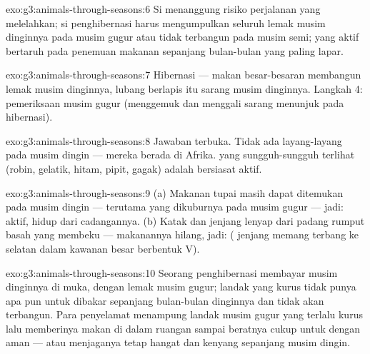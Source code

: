 \begin{solution}{exo:g3:animals-through-seasons:6}
Si  menanggung risiko perjalanan yang melelahkan; si
penghibernasi harus mengumpulkan seluruh lemak musim dinginnya pada
musim gugur atau tidak terbangun pada musim semi;  yang aktif
bertaruh pada penemuan makanan sepanjang bulan-bulan yang paling
lapar.
\end{solution}

\begin{solution}{exo:g3:animals-through-seasons:7}
Hibernasi --- makan besar-besaran membangun lemak musim dinginnya,
lubang berlapis  itu sarang musim dinginnya. Langkah 4: pemeriksaan
musim gugur (menggemuk dan menggali sarang menunjuk pada hibernasi).
\end{solution}

\begin{solution}{exo:g3:animals-through-seasons:8}
Jawaban terbuka. Tidak ada  layang-layang pada musim dingin ---
mereka berada di Afrika.  yang sungguh-sungguh terlihat (robin,
gelatik,  hitam, pipit, gagak) adalah  bersiasat aktif.
\end{solution}

\begin{solution}{exo:g3:animals-through-seasons:9}
(a) Makanan tupai masih dapat ditemukan pada musim dingin --- terutama
yang dikuburnya pada musim gugur --- jadi: aktif, hidup dari
cadangannya. (b) Katak dan   jenjang lenyap dari padang
rumput basah yang membeku --- makanannya hilang, jadi:  (
jenjang memang terbang ke selatan dalam kawanan besar berbentuk V).
\end{solution}

\begin{solution}{exo:g3:animals-through-seasons:10}
Seorang penghibernasi membayar musim dinginnya di muka, dengan lemak
musim gugur; landak yang kurus tidak punya apa pun untuk dibakar
sepanjang bulan-bulan  dinginnya dan tidak akan terbangun. Para
penyelamat menampung landak musim gugur yang terlalu kurus lalu
memberinya makan di dalam ruangan sampai beratnya cukup untuk
 dengan aman --- atau menjaganya tetap hangat dan
kenyang sepanjang musim dingin.
\end{solution}
